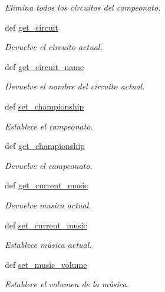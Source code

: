 \begin{DoxyCompactItemize}
\begin{DoxyCompactList}\small\item\em \-Elimina todos los circuitos del campeonato. \end{DoxyCompactList}\item 
def \hyperlink{classengine_1_1config_1_1Config_a79e489fa2273a3d340045edb5abc7b7f}{get\-\_\-circuit}
\begin{DoxyCompactList}\small\item\em \-Devuelve el circuito actual. \end{DoxyCompactList}\item 
def \hyperlink{classengine_1_1config_1_1Config_a907c0e9d628b7ae8bab4ed9d7559ebc4}{get\-\_\-circuit\-\_\-name}
\begin{DoxyCompactList}\small\item\em \-Devuelve el nombre del circuito actual. \end{DoxyCompactList}\item 
def \hyperlink{classengine_1_1config_1_1Config_a2735bc69e1628cf63794321a9fa643da}{set\-\_\-championship}
\begin{DoxyCompactList}\small\item\em \-Establece el campeonato. \end{DoxyCompactList}\item 
def \hyperlink{classengine_1_1config_1_1Config_a796b16494b18cc3f199c75638f736c32}{get\-\_\-championship}
\begin{DoxyCompactList}\small\item\em \-Devuelve el campeonato. \end{DoxyCompactList}\item 
def \hyperlink{classengine_1_1config_1_1Config_a50112e7839dda9370e8e96380393e085}{get\-\_\-current\-\_\-music}
\begin{DoxyCompactList}\small\item\em \-Devuelve musica actual. \end{DoxyCompactList}\item 
def \hyperlink{classengine_1_1config_1_1Config_ad6b401af09d02161681bb109a989712a}{set\-\_\-current\-\_\-music}
\begin{DoxyCompactList}\small\item\em \-Establece música actual. \end{DoxyCompactList}\item 
def \hyperlink{classengine_1_1config_1_1Config_aa46c73c2c076c1a3ba6f865dd950d2f3}{set\-\_\-music\-\_\-volume}
\begin{DoxyCompactList}\small\item\em \-Establece el volumen de la música. \end{DoxyCompactList}\item 

\end{DoxyCompactItemize}
